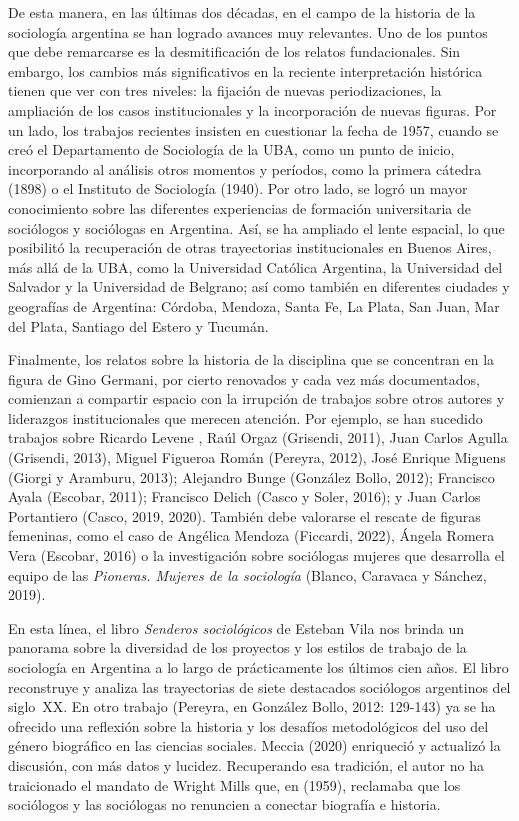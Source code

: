 De esta manera, en las últimas dos décadas, en el campo de la historia de la sociología argentina se han logrado avances muy relevantes. Uno de los puntos que debe remarcarse es la desmitificación de los relatos fundacionales. Sin embargo, los cambios más significativos en la reciente interpretación histórica tienen que ver con tres niveles: la fijación de nuevas periodizaciones, la ampliación de los casos institucionales y la incorporación de nuevas figuras. Por un lado, los trabajos recientes insisten en cuestionar la fecha de 1957, cuando se creó el Departamento de Sociología de la UBA, como un punto de inicio, incorporando al análisis otros momentos y períodos, como la primera cátedra (1898) o el Instituto de Sociología (1940). Por otro lado, se logró un mayor conocimiento sobre las diferentes experiencias de formación universitaria de sociólogos y sociólogas en Argentina. Así, se ha ampliado el lente espacial, lo que posibilitó la recuperación de otras trayectorias institucionales en Buenos Aires, más allá de la UBA, como la Universidad Católica Argentina, la Universidad del Salvador y la Universidad de Belgrano; así como también en diferentes ciudades y geografías de Argentina: Córdoba, Mendoza, Santa Fe, La Plata, San Juan, Mar del Plata, Santiago del Estero y Tucumán.

Finalmente, los relatos sobre la historia de la disciplina que se concentran en la figura de Gino Germani, por cierto renovados y cada vez más documentados, comienzan a compartir espacio con la irrupción de trabajos sobre otros autores y liderazgos institucionales que merecen atención. Por ejemplo, se han sucedido trabajos sobre Ricardo Levene \parencite{1530-RAJMANOVICH2016}, Raúl Orgaz \parencite{1528-REQUENA2010}(Grisendi, 2011), Juan Carlos Agulla (Grisendi, 2013), Miguel Figueroa Román (Pereyra, 2012), José Enrique Miguens (Giorgi y Aramburu, 2013); Alejandro Bunge (González Bollo, 2012); Francisco Ayala (Escobar, 2011); Francisco Delich (Casco y Soler, 2016); y Juan Carlos Portantiero (Casco, 2019, 2020). También debe valorarse el rescate de figuras femeninas, como el caso de Angélica Mendoza (Ficcardi, 2022), Ángela Romera Vera (Escobar, 2016) o la investigación sobre sociólogas mujeres que desarrolla el equipo de las \emph{Pioneras. Mujeres de la sociología} (Blanco, Caravaca y Sánchez, 2019).

En esta línea, el libro \emph{Senderos sociológicos} de Esteban Vila nos brinda un panorama sobre la diversidad de los proyectos y los estilos de trabajo de la sociología en Argentina a lo largo de prácticamente los últimos cien años. El libro reconstruye y analiza las trayectorias de siete destacados sociólogos argentinos del siglo~XX. En otro trabajo (Pereyra, en González Bollo, 2012: 129-143) ya se ha ofrecido una reflexión sobre la historia y los desafíos metodológicos del uso del género biográfico en las ciencias sociales. Meccia (2020) enriqueció y actualizó la discusión, con más datos y lucidez. Recuperando esa tradición, el autor no ha traicionado el mandato de Wright Mills que, en  (1959), reclamaba que los sociólogos y las sociólogas no renuncien a conectar biografía e historia.

